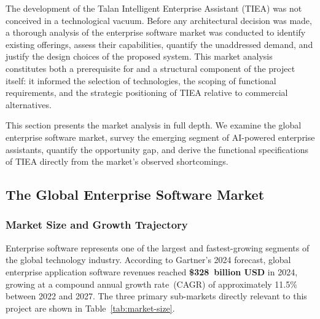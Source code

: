 \documentclass[12pt,a4paper]{report}
\begin{document}
The development of the Talan Intelligent Enterprise Assistant (TIEA) was not conceived in a
technological vacuum.
Before any architectural decision was made, a thorough analysis of the enterprise software market
was conducted to identify existing offerings, assess their capabilities, quantify the unaddressed
demand, and justify the design choices of the proposed system.
This market analysis constitutes both a prerequisite for and a structural component of the project
itself: it informed the selection of technologies, the scoping of functional requirements, and the
strategic positioning of TIEA relative to commercial alternatives.

This section presents the market analysis in full depth.
We examine the global enterprise software market, survey the emerging segment of AI-powered enterprise
assistants, quantify the opportunity gap, and derive the functional specifications of TIEA directly
from the market's observed shortcomings.

\subsection{The Global Enterprise Software Market}

\subsubsection{Market Size and Growth Trajectory}

Enterprise software represents one of the largest and fastest-growing segments of the global
technology industry.
According to Gartner's 2024 forecast, global enterprise application software revenues reached
\textbf{\$328~billion USD} in 2024, growing at a compound annual growth rate~(CAGR) of approximately
11.5\% between 2022 and 2027.
The three primary sub-markets directly relevant to this project are shown in
Table~\ref{tab:market-size}.
\end{document}
